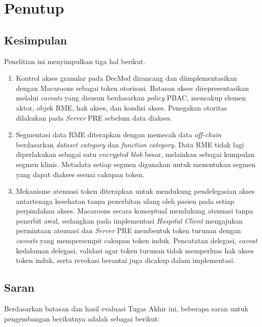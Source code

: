 \chapter{Penutup}
\label{chap:penutup}

\section{Kesimpulan}

Penelitian ini menyimpulkan tiga hal berikut.

\begin{enumerate}
	\item Kontrol akses granular pada DecMed dirancang dan diimplementasikan dengan Macaroons sebagai token otorisasi. Batasan akses direpresentasikan melalui \textit{caveats} yang disusun berdasarkan \textit{policy} PBAC, mencakup elemen aktor, objek RME, hak akses, dan kondisi akses. Penegakan otoritas dilakukan pada \textit{Server} PRE sebelum data diakses.

	\item Segmentasi data RME diterapkan dengan memecah data \textit{off-chain} berdasarkan \textit{dataset category} dan \textit{function category}. Data RME tidak lagi diperlakukan sebagai satu \textit{encrypted blob} besar, melainkan sebagai kumpulan segmen klinis. Metadata setiap segmen digunakan untuk menentukan segmen yang dapat diakses sesuai cakupan token.

	\item Mekanisme atenuasi token diterapkan untuk mendukung pendelegasian akses antartenaga kesehatan tanpa penerbitan ulang oleh pasien pada setiap perpindahan akses. Macaroons secara konseptual mendukung atenuasi tanpa penerbit awal, sedangkan pada implementasi \textit{Hospital Client} mengajukan permintaan atenuasi dan \textit{Server} PRE membentuk token turunan dengan \textit{caveats} yang mempersempit cakupan token induk. Pencatatan delegasi, \textit{caveat} kedalaman delegasi, validasi agar token turunan tidak memperluas hak akses token induk, serta revokasi berantai juga dicakup dalam implementasi.
\end{enumerate}

\section{Saran}

Berdasarkan batasan dan hasil evaluasi Tugas Akhir ini, beberapa saran untuk pengembangan berikutnya adalah sebagai berikut:

